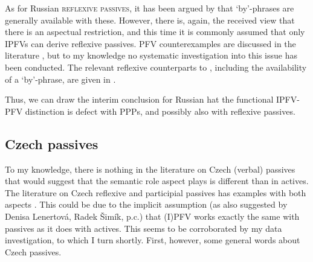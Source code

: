 \documentclass[output=paper,colorlinks,citecolor=brown]{langscibook}
\begin{document}
As for Russian \textsc{reflexive passives}, it has been argued by \citet{fehrmann+10} that `by'-phrases are generally available with these. However, there is, again, the received view that there is an aspectual restriction, and this time it is commonly assumed that only IPFVs can derive reflexive passives. PFV counterexamples are discussed in the literature \citep[e.g.][]{Schoorlemmer1995,fehrmann+10}, but to my knowledge no systematic investigation into this issue has been conducted. The relevant reflexive counterparts to , including the availability of a `by'-phrase, are given in  \citep[from][54]{Borik.Gehrke2018}.


\ea 
\label{ex:storozrefl}
\z 
\z 

\noindent Thus, we can draw the interim conclusion for Russian hat the functional IPFV-PFV distinction is defect with PPPs, and possibly also with reflexive passives. 

\subsection{Czech passives}

To my knowledge, there is nothing in the literature on Czech (verbal) passives that would suggest that the semantic role aspect plays is different than in actives. The literature on Czech reflexive and participial passives has examples with both aspects \citep[e.g.][]{veselovskakarlik,medovadiss,fehrmann+10,karlik17,karlik20,cahamedova20}. This could be due to the implicit assumption (as also suggested by Denisa Lenertová, Radek Šimík, p.c.) that (I)PFV works exactly the same with passives as it does with actives. This seems to be corroborated by my data investigation, to which I turn shortly. First, however, some general words about Czech passives. 
\end{document}
